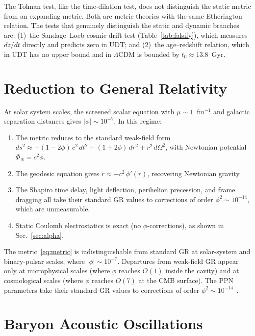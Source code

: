 \documentclass[aps,prd,twocolumn,superscriptaddress,nofootinbib,longbibliography]{revtex4-2}
\begin{document}
The Tolman test, like the time-dilation test, does not distinguish the
static metric from an expanding metric.  Both are metric theories with
the same Etherington relation.  The tests that genuinely distinguish
the static and dynamic branches are: (1)~the Sandage--Loeb cosmic
drift test (Table~\ref{tab:falsify}), which measures $dz/dt$ directly
and predicts zero in UDT; and (2)~the age--redshift relation, which in
UDT has no upper bound and in $\Lambda$CDM is bounded by
$t_0 \approx 13.8$~Gyr.

\section{Reduction to General Relativity}\label{sec:gr-reduction}

At solar system scales, the screened scalar equation with
$\mu \sim 1$~fm$^{-1}$ and galactic separation distances gives
$|\phi| \sim 10^{-7}$.  In this regime:
\begin{enumerate}
\item The metric reduces to the standard weak-field form
  $ds^2 \approx -(1 - 2\phi)\,c^2\,dt^2 + (1 + 2\phi)\,dr^2
  + r^2\,d\Omega^2$,
  with Newtonian potential $\Phi_N = c^2\phi$.
\item The geodesic equation gives $\ddot{r} \approx -c^2\,\phi'(r)$,
  recovering Newtonian gravity.
\item The Shapiro time delay, light deflection, perihelion precession,
  and frame dragging all take their standard GR values to corrections
  of order $\phi^2 \sim 10^{-14}$, which are unmeasurable.
\item Static Coulomb electrostatics is exact (no $\phi$-corrections),
  as shown in Sec.~\ref{sec:alpha}.
\end{enumerate}
The metric~\eqref{eq:metric} is indistinguishable from standard GR at
solar-system and binary-pulsar scales, where $|\phi| \sim 10^{-7}$.
Departures from weak-field GR appear only at microphysical scales
(where $\phi$ reaches $O(1)$ inside the cavity) and at cosmological
scales (where $\phi$ reaches $O(7)$ at the CMB surface).  The PPN
parameters take their standard GR values to corrections of order
$\phi^2 \sim 10^{-14}$~\cite{Will2014}.

\section{Baryon Acoustic Oscillations}\label{sec:bao}
\end{document}

